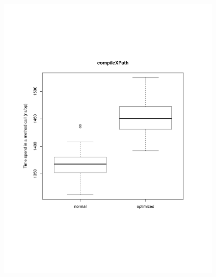 \begin{figure}[H]
	\centering

	\centerline{
		\includegraphics[trim=0mm 60mm 20mm 50mm,scale=0.50]{pictures/boxplot_compileXPath.pdf}
}
\end{figure}
